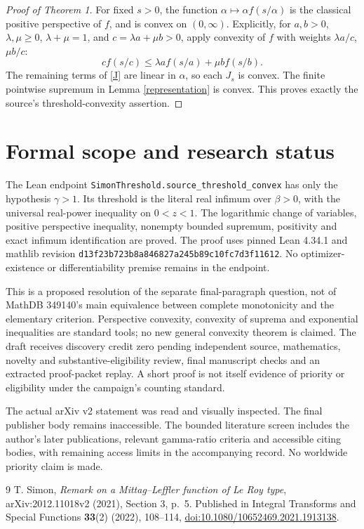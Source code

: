 \documentclass[11pt]{article}
\begin{document}
\begin{proof}[Proof of Theorem 1]
For fixed $s>0$, the function $\alpha\mapsto\alpha f(s/\alpha)$ is the classical positive perspective of $f$, and is convex on $(0,\infty)$. Explicitly, for $a,b>0$, $\lambda,\mu\geq0$, $\lambda+\mu=1$, and $c=\lambda a+\mu b>0$, apply convexity of $f$ with weights $\lambda a/c$, $\mu b/c$:
\[
 c f(s/c)\leq\lambda a f(s/a)+\mu b f(s/b).
\]
The remaining terms of \eqref{J} are linear in $\alpha$, so each $J_s$ is convex. The finite pointwise supremum in Lemma \ref{representation} is convex. This proves exactly the source's threshold-convexity assertion.
\end{proof}

\section*{Formal scope and research status}
The Lean endpoint \texttt{SimonThreshold.source\_threshold\_convex} has only the hypothesis $\gamma>1$. Its threshold is the literal real infimum over $\beta>0$, with the universal real-power inequality on $0<z<1$. The logarithmic change of variables, positive perspective inequality, nonempty bounded supremum, positivity and exact infimum identification are proved. The proof uses pinned Lean 4.34.1 and mathlib revision \texttt{d13f23b723b8a846827a245b89c10fc7d3f11612}. No optimizer-existence or differentiability premise remains in the endpoint.

This is a proposed resolution of the separate final-paragraph question, not of MathDB 349140's main equivalence between complete monotonicity and the elementary criterion. Perspective convexity, convexity of suprema and exponential inequalities are standard tools; no new general convexity theorem is claimed. The draft receives discovery credit zero pending independent source, mathematics, novelty and substantive-eligibility review, final manuscript checks and an extracted proof-packet replay. A short proof is not itself evidence of priority or eligibility under the campaign's counting standard.

The actual arXiv v2 statement was read and visually inspected. The final publisher body remains inaccessible. The bounded literature screen includes the author's later publications, relevant gamma-ratio criteria and accessible citing bodies, with remaining access limits in the accompanying record. No worldwide priority claim is made.

\begin{thebibliography}{9}
 T. Simon, \emph{Remark on a Mittag--Leffler function of Le Roy type}, arXiv:2012.11018v2 (2021), Section 3, p.~5. Published in Integral Transforms and Special Functions \textbf{33}(2) (2022), 108--114, \href{https://doi.org/10.1080/10652469.2021.1913138}{doi:10.1080/10652469.2021.1913138}.
\end{thebibliography}
\end{document}

